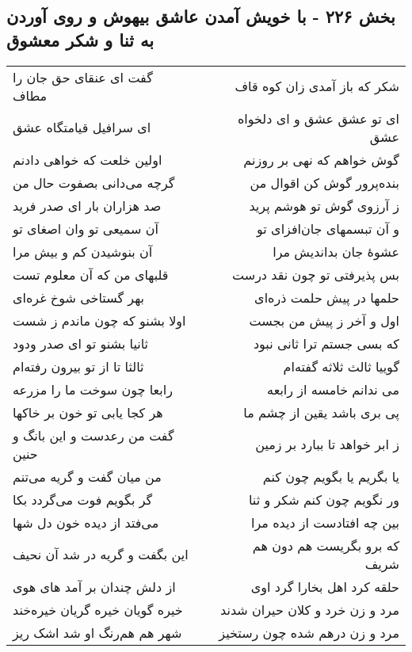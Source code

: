 \begin{center}
\section*{بخش ۲۲۶ - با خویش آمدن عاشق بیهوش و روی آوردن به ثنا و شکر معشوق}
\label{sec:sh226}
\begin{longtable}{l p{0.5cm} r}
گفت ای عنقای حق جان را مطاف
&&
شکر که باز آمدی زان کوه قاف
\\
ای سرافیل قیامتگاه عشق
&&
ای تو عشق عشق و ای دلخواه عشق
\\
اولین خلعت که خواهی دادنم
&&
گوش خواهم که نهی بر روزنم
\\
گرچه می‌دانی بصفوت حال من
&&
بنده‌پرور گوش کن اقوال من
\\
صد هزاران بار ای صدر فرید
&&
ز آرزوی گوش تو هوشم پرید
\\
آن سمیعی تو وان اصغای تو
&&
و آن تبسمهای جان‌افزای تو
\\
آن بنوشیدن کم و بیش مرا
&&
عشوهٔ جان بداندیش مرا
\\
قلبهای من که آن معلوم تست
&&
بس پذیرفتی تو چون نقد درست
\\
بهر گستاخی شوخ غره‌ای
&&
حلمها در پیش حلمت ذره‌ای
\\
اولا بشنو که چون ماندم ز شست
&&
اول و آخر ز پیش من بجست
\\
ثانیا بشنو تو ای صدر ودود
&&
که بسی جستم ترا ثانی نبود
\\
ثالثا تا از تو بیرون رفته‌ام
&&
گوییا ثالث ثلاثه گفته‌ام
\\
رابعا چون سوخت ما را مزرعه
&&
می ندانم خامسه از رابعه
\\
هر کجا یابی تو خون بر خاکها
&&
پی بری باشد یقین از چشم ما
\\
گفت من رعدست و این بانگ و حنین
&&
ز ابر خواهد تا ببارد بر زمین
\\
من میان گفت و گریه می‌تنم
&&
یا بگریم یا بگویم چون کنم
\\
گر بگویم فوت می‌گردد بکا
&&
ور نگویم چون کنم شکر و ثنا
\\
می‌فتد از دیده خون دل شها
&&
بین چه افتادست از دیده مرا
\\
این بگفت و گریه در شد آن نحیف
&&
که برو بگریست هم دون هم شریف
\\
از دلش چندان بر آمد های هوی
&&
حلقه کرد اهل بخارا گرد اوی
\\
خیره گویان خیره گریان خیره‌خند
&&
مرد و زن خرد و کلان حیران شدند
\\
شهر هم هم‌رنگ او شد اشک ریز
&&
مرد و زن درهم شده چون رستخیز
\\

\end{longtable}
\end{center}

